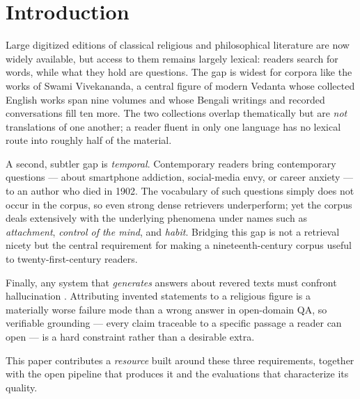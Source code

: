 \documentclass[pdflatex,sn-mathphys-num]{sn-jnl}
\begin{document}

\maketitle

\section{Introduction}

Large digitized editions of classical religious and philosophical
literature are now widely available, but access to them remains largely
lexical: readers search for words, while what they hold are questions.
The gap is widest for corpora like the works of Swami Vivekananda, a
central figure of modern Vedanta whose collected English works span nine
volumes and whose Bengali writings and recorded conversations fill ten
more. The two collections overlap thematically but are \emph{not}
translations of one another; a reader fluent in only one language has no
lexical route into roughly half of the material.

A second, subtler gap is \emph{temporal}. Contemporary readers bring
contemporary questions --- about smartphone addiction, social-media envy,
or career anxiety --- to an author who died in 1902. The vocabulary of
such questions simply does not occur in the corpus, so even strong dense
retrievers underperform; yet the corpus deals extensively with the
underlying phenomena under names such as \emph{attachment},
\emph{control of the mind}, and \emph{habit}. Bridging this gap is not a
retrieval nicety but the central requirement for making a
nineteenth-century corpus useful to twenty-first-century readers.

Finally, any system that \emph{generates} answers about revered texts
must confront hallucination \cite{ji2023survey}. Attributing invented
statements to a religious figure is a materially worse failure mode than
a wrong answer in open-domain QA, so verifiable grounding --- every claim
traceable to a specific passage a reader can open --- is a hard
constraint rather than a desirable extra.

This paper contributes a \emph{resource} built around these three
requirements, together with the open pipeline that produces it and the
evaluations that characterize its quality.
\end{document}
